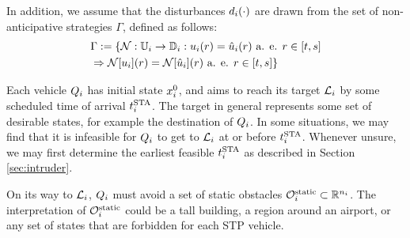
In addition, we assume that the disturbances $d_i(\cdot)$ are drawn from the set of non-anticipative strategies \cite{Mitchell05} $\Gamma$, defined as follows:
\begin{equation}
\begin{aligned}
& \Gamma := \{\mathcal{N}: \mathbb{U}_i \rightarrow \mathbb{D}_i:  u_i(r) = \hat{u}_i(r) \text{ a. e. } r\in[t,s] \\
& \Rightarrow \mathcal{N}[u_i](r) = \mathcal{N}[\hat{u}_i](r) \text{ a. e. } r\in[t,s]\}
\end{aligned}
\end{equation}

Each vehicle $Q_i$ has initial state $x^0_i$, and aims to reach its target $\mathcal{L}_i$ by some scheduled time of arrival $t^\text{STA}_i$. The target in general represents some set of desirable states, for example the destination of $Q_i$. %
In some situations, we may find that it is infeasible for $Q_i$ to get to $\mathcal{L}_i$ at or before $t^\text{STA}_i$. Whenever unsure, we may first determine the earliest feasible $t^\text{STA}_i$ as described in Section \ref{sec:intruder}. 

On its way to $\mathcal{L}_i$, $Q_i$ must avoid a set of static obstacles $\mathcal{O}^\text{static}_i \subset \mathbb{R}^{n_i}$. The interpretation of $\mathcal{O}^\text{static}_i$ could be a tall building, a region around an airport, or any set of states that are forbidden for each STP vehicle.

